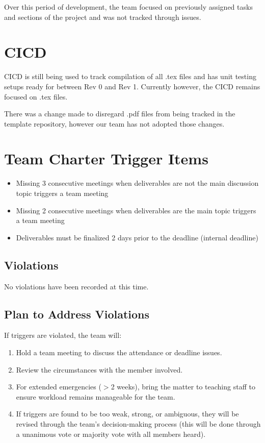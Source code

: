 \documentclass{article}
\begin{document}
Over this period of development, the team focused on previously assigned tasks and sections of the project and was not tracked through issues.

\section{CICD}

CICD is still being used to track compilation of all .tex files and has unit testing setups ready for between Rev 0 and Rev 1. Currently however, the CICD remains focused on .tex files.

There was a change made to disregard .pdf files from being tracked in the template repository, however our team has not adopted those changes.

\section{Team Charter Trigger Items}

\begin{itemize}
    \item Missing 3 consecutive meetings when deliverables are not the main discussion topic triggers a team meeting
    \item Missing 2 consecutive meetings when deliverables are the main topic triggers a team meeting
    \item Deliverables must be finalized 2 days prior to the deadline (internal deadline)
\end{itemize}
 
\subsection{Violations}
No violations have been recorded at this time.
 
\subsection{Plan to Address Violations}
If triggers are violated, the team will:

\begin{enumerate}
    \item Hold a team meeting to discuss the attendance or deadline issues.
    \item Review the circumstances with the member involved.
    \item For extended emergencies ($>$2 weeks), bring the matter to teaching staff to ensure workload remains manageable for the team.
    \item If triggers are found to be too weak, strong, or ambiguous, they will be revised through the team's decision-making process (this will be done through a unanimous vote or majority vote with all members heard).
\end{enumerate}
\end{document}
